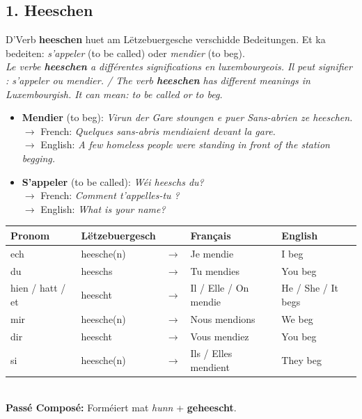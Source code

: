 \subsection*{1. Heeschen}
D'Verb \textbf{heeschen} huet am Lëtzebuergesche verschidde Bedeitungen. Et ka bedeiten: \textit{s'appeler} (to be called) oder \textit{mendier} (to beg). \\
\textit{Le verbe \textbf{heeschen} a différentes significations en luxembourgeois. Il peut signifier : s'appeler ou mendier. / The verb \textbf{heeschen} has different meanings in Luxembourgish. It can mean: to be called or to beg.}

\begin{itemize}
    \item \textbf{Mendier} (to beg): \textit{Virun der Gare stoungen e puer Sans-abrien ze heeschen.} \\
    $\rightarrow$ French: \textit{Quelques sans-abris mendiaient devant la gare.} \\
    $\rightarrow$ English: \textit{A few homeless people were standing in front of the station begging.}
    
    \item \textbf{S'appeler} (to be called): \textit{Wéi heeschs du?} \\
    $\rightarrow$ French: \textit{Comment t'appelles-tu ?} \\
    $\rightarrow$ English: \textit{What is your name?}
\end{itemize}

\begin{tabular}{ll c l l}
    \toprule
    \textbf{Pronom} & \textbf{Lëtzebuergesch} & \textbf{} & \textbf{Français} & \textbf{English} \\
    \midrule
    ech & heesche(n) & $\rightarrow$ & Je mendie & I beg \\
    du & heeschs & $\rightarrow$ & Tu mendies & You beg \\
    hien / hatt / et & heescht & $\rightarrow$ & Il / Elle / On mendie & He / She / It begs \\
    \midrule
    mir & heesche(n) & $\rightarrow$ & Nous mendions & We beg \\
    dir & heescht & $\rightarrow$ & Vous mendiez & You beg \\
    si & heesche(n) & $\rightarrow$ & Ils / Elles mendient & They beg \\
    \bottomrule
\end{tabular}
\\[0.5em]
\textbf{Passé Composé:} Forméiert mat \textit{hunn} + \textbf{geheescht}.

